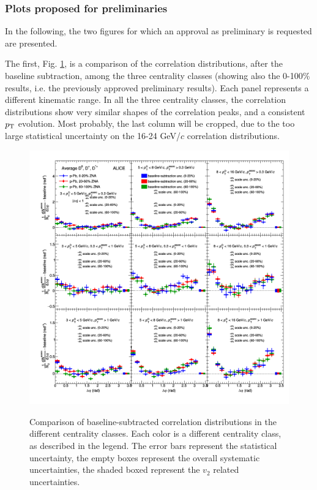 \subsubsection{Plots proposed for preliminaries}
In the following, the two figures for which an approval as preliminary is requested are presented.

The first, Fig. \ref{fig:prel1}, is a comparison of the correlation distributions, after the baseline subtraction, among the three centrality classes (showing also the 0-100\% results, i.e. the previously approved preliminary results). Each panel represents a different kinematic range. In all the three centrality classes, the correlation distributions show very similar shapes of the correlation peaks, and a consistent $p_{\rm T}$ evolution. Most probably, the last column will be cropped, due to the too large statistical uncertainty on the 16-24 GeV/$c$ correlation distributions.

\begin{landscape}
\begin{figure}
\centering
{\includegraphics[width=0.9\linewidth]{figuresVsCent/Averages/Trends/plotComparison_WeightedAverage_pp_pPb_UniqueCanvas_Style1_FinalQM.png}}
 \caption{Comparison of baseline-subtracted correlation distributions in the different centrality classes. Each color is a different centrality class, as described in the legend. The error bars represent the statistical uncertainty, the empty boxes represent the overall systematic uncertainties, the shaded boxed represent the $v_2$ related uncertainties.}
\label{fig:prel1}
\end{figure}
\end{landscape}

